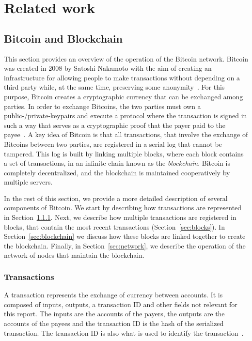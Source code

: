 \chapter{Related work}
\section{Bitcoin and Blockchain}
\label{sec:bb}
This section provides an overview of the operation of the Bitcoin network. Bitcoin was created in 2008 by Satoshi Nakamoto with the aim of creating an infrastructure for allowing people to make transactions without depending on a third party while, at the same time, preserving some anonymity~\cite{nakamoto2008bitcoin}. For this purpose, Bitcoin creates a cryptographic currency that can be exchanged among parties. In order to exchange Bitcoins, the two parties must own a public-/private-keypairs and execute a protocol where the transaction is signed in such a way that serves as a cryptographic proof that the payer paid to the payee~\cite{decker2013information}. A key idea of Bitcoin is that all transactions, that involve the exchange of Bitcoins between two parties, are registered in a serial log that cannot be tampered. This log is built by linking multiple blocks, where each block contains a set of transactions, in an infinite chain known as the \emph{blockchain}. Bitcoin is completely decentralized, and the blockchain is maintained cooperatively by multiple servers.

In the rest of this section, we provide a more detailed description of several components of Bitcoin. We start by describing how transactions are represented in Section~\ref{sec:transactions}. Next, we describe how multiple transactions are registered in blocks, that contain the most recent transactions (Section~\ref{sec:blocks}). In Section~\ref{sec:blockchain} we discuss how these blocks are linked together to create the blockchain. Finally, in Section~\ref{sec:network}, we describe the operation of the network of nodes that maintain the blockchain.

\subsection{Transactions}
\label{sec:transactions}

A  transaction represents the exchange of currency between accounts. It is composed of inputs, outputs, a transaction ID and other fields not relevant for this report. The inputs are the accounts of the payers, the outputs are the accounts of the payees and the transaction ID is the hash of the serialized transaction. The transaction ID is also what is used to identify the transaction~\cite{decker2013information}.

